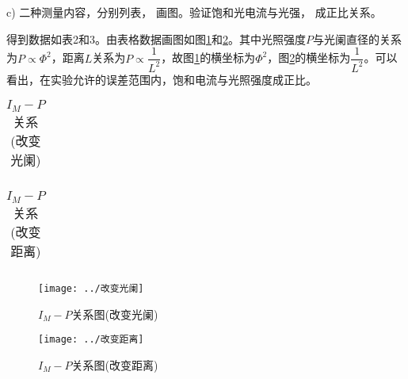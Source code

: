 \documentclass[11pt]{article}
\begin{document}
c) 二种测量内容，分别列表， 画图。验证饱和光电流与光强， 成正比关系。\songti

得到数据如表2和3。由表格数据画图如图\ref{fig:4}和\ref{fig:5}。其中光照强度$ P $与光阑直径的关系为$ P\propto \Phi^2 $，距离$ L $关系为$ P\propto \dfrac{1}{L^2}  $，故图\ref{fig:4}的横坐标为$ \Phi^2 $，图\ref{fig:5}的横坐标为$ \dfrac{1}{L^2} $。可以看出，在实验允许的误差范围内，饱和电流与光照强度成正比。
\begin{table}[htbp]\small
	\caption{$ I_M-P $关系(改变光阑)}
	\centering
	\begin{tabular}{c|cccc}
	\end{tabular}
\end{table}
\begin{table}[htbp]
	\caption{$ I_M-P $关系(改变距离)}
	\centering
	\begin{tabular}{c|cccccc}
		\bottomrule
	\end{tabular}
\end{table}
\begin{figure}[htbp]
	\centering
	\texttt{[image: ../改变光阑]}
	\caption{$ I_M-P $关系图(改变光阑)}
	\label{fig:4}
\end{figure}
\begin{figure}
	\centering
	\texttt{[image: ../改变距离]}
	\caption{$ I_M-P $关系图(改变距离)}
	\label{fig:5}
\end{figure}
\end{document}

